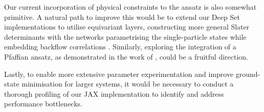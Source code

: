 Our current incorporation of physical constraints to the ansatz is also somewhat primitive. A natural path to improve this would be to extend our Deep Set implementations to utilise equivariant layers, constructing more general Slater determinants with the networks parametrising the single-particle states while embedding backflow correlations \cite{Luo_2019}. Similarly, exploring the integration of a Pfaffian ansatz, as demonstrated in the work of \cite{jane}, could be a fruitful direction.
 
Lastly, to enable more extensive parameter experimentation and improve ground-state minimisation for larger systems, it would be necessary to conduct a thorough profiling of our JAX implementation to identify and address performance bottlenecks. 











